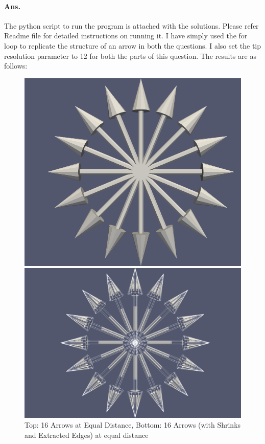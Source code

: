 \documentclass[a4paper,11pt]{article}
\theoremstyle{mytheor}
\begin{document}
\paragraph{Ans.} The python script to run the program is attached with the solutions. Please refer Readme file for detailed instructions on running it. I have simply used the for loop to replicate the structure of an arrow in both the questions. I also set the tip resolution parameter to 12 for both the parts of this question. The results are as follows:
\begin{figure}[!h]
    \centering
    \includegraphics[scale = 0.4]{Q5_1.PNG}
    
    \vspace{1 cm}
    \includegraphics[scale = 0.33]{Q5_2.PNG}
    
    \caption{Top: 16 Arrows at Equal Distance, Bottom: 16 Arrows (with Shrinks and Extracted Edges) at equal distance}
    \label{fig:q32}
\end{figure}
\end{document}
